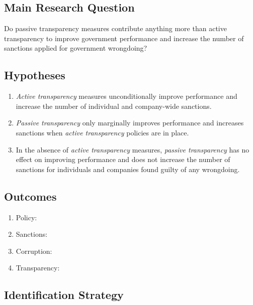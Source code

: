 \documentclass[]{article}
\begin{document}
\hypertarget{main-research-question-2}{%
\subsection{Main Research Question}\label{main-research-question-2}}

Do passive transparency measures contribute anything more than active
transparency to improve government performance and increase the number
of sanctions applied for government wrongdoing?

\hypertarget{hypotheses-2}{%
\subsection{Hypotheses}\label{hypotheses-2}}

\begin{enumerate}
\item
  \emph{Active transparency} measures unconditionally improve
  performance and increase the number of individual and company-wide
  sanctions.
\item
  \emph{Passive transparency} only marginally improves performance and
  increases sanctions when \emph{active transparency} policies are in
  place.
\item
  In the absence of \emph{active transparency} measures, \emph{passive
  transparency} has no effect on improving performance and does not
  increase the number of sanctions for individuals and companies found
  guilty of any wrongdoing.
\end{enumerate}

\hypertarget{outcomes-2}{%
\subsection{Outcomes}\label{outcomes-2}}

\begin{enumerate}
\item
  Policy:
\item
  Sanctions:
\item
  Corruption:
\item
  Transparency:
\end{enumerate}

\hypertarget{identification-strategy-2}{%
\subsection{Identification Strategy}\label{identification-strategy-2}}
\end{document}
